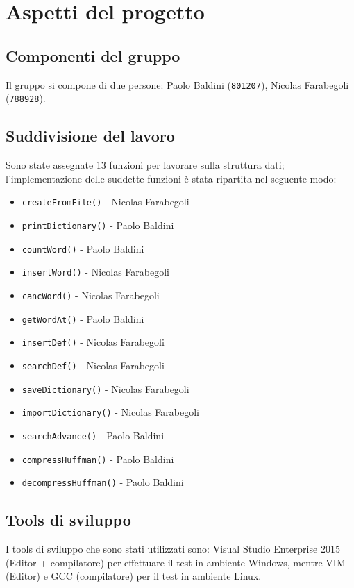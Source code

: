 \documentclass[paper=a4, fontsize=11pt,twoside]{scrartcl}   %
\begin{document}
		\section{Aspetti del progetto}
			\subsection{Componenti del gruppo}
				Il gruppo si compone di due persone: Paolo Baldini (\texttt{801207}), Nicolas Farabegoli (\texttt{788928}).
			\subsection{Suddivisione del lavoro}
				Sono state assegnate 13 funzioni per lavorare sulla struttura dati; l'implementazione delle suddette funzioni è stata ripartita nel seguente modo:
				\begin{itemize}
					\item \texttt{createFromFile()} - Nicolas Farabegoli
					\item \texttt{printDictionary()} - Paolo Baldini
					\item \texttt{countWord()} - Paolo Baldini
					\item \texttt{insertWord()} - Nicolas Farabegoli
					\item \texttt{cancWord()} - Nicolas Farabegoli
					\item \texttt{getWordAt()} - Paolo Baldini
					\item \texttt{insertDef()} - Nicolas Farabegoli
					\item \texttt{searchDef()} - Nicolas Farabegoli
					\item \texttt{saveDictionary()} - Nicolas Farabegoli
					\item \texttt{importDictionary()} - Nicolas Farabegoli
					\item \texttt{searchAdvance()} - Paolo Baldini
					\item \texttt{compressHuffman()} - Paolo Baldini
					\item \texttt{decompressHuffman()} - Paolo Baldini			
				\end{itemize}
			 
			 \subsection{Tools di sviluppo}
			 	I tools di sviluppo che sono stati utilizzati sono: Visual Studio Enterprise 2015 (Editor + compilatore) per effettuare il test in ambiente Windows, mentre VIM (Editor) e GCC (compilatore) per il test in ambiente Linux.
			 	
\end{document}
